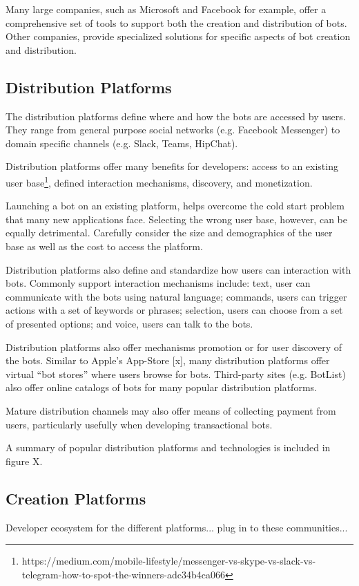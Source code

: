 \documentclass{sig-alternate}
\begin{document}
	Many large companies, such as Microsoft and Facebook for example, offer a comprehensive set of tools to support both the creation and distribution of bots. Other companies, provide specialized solutions for specific aspects of bot creation and distribution. 

	\subsection{Distribution Platforms}
	The distribution platforms define where and how the bots are accessed by users. They range from general purpose social networks (e.g. Facebook Messenger) to domain specific channels (e.g. Slack, Teams, HipChat).  

	Distribution platforms offer many benefits for developers: access to an existing user base\footnote{https://medium.com/mobile-lifestyle/messenger-vs-skype-vs-slack-vs-telegram-how-to-spot-the-winners-adc34b4ca066\label{How_to_spot_the_winners}}, defined interaction mechanisms, discovery, and monetization.  

	Launching a bot on an existing platform, helps overcome the cold start problem that many new applications face. Selecting the wrong user base, however, can be equally detrimental. Carefully consider the size and demographics of the user base as well as the cost to access the platform. 

	Distribution platforms also define and standardize how users can interaction with bots.  Commonly support interaction mechanisms include: text, user can communicate with the bots using natural language; commands, users can trigger actions with a set of keywords or phrases; selection, users can choose from a set of presented options; and voice, users can talk to the bots.

	Distribution platforms also offer mechanisms promotion or for user discovery of the bots. Similar to Apple's App-Store [x], many distribution platforms offer virtual ``bot stores'' where users browse for bots. Third-party sites (e.g. BotList) also offer online catalogs of bots for many popular distribution platforms. 

	Mature distribution channels may also offer means of collecting payment from users, particularly usefully when developing transactional bots.

	A summary of popular distribution platforms and technologies is included in figure X.

	\subsection{Creation Platforms}
	Developer ecosystem for the different platforms...  plug in to these communities...
\end{document}
